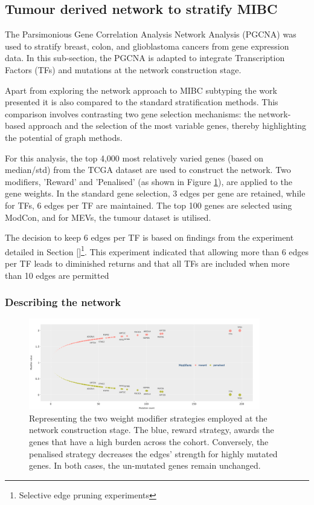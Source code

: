 \subsection{Tumour derived network to stratify MIBC} \label{s:N_I:tum}


The Parsimonious Gene Correlation Analysis Network Analysis (PGCNA) was used to stratify breast, colon, and glioblastoma cancers \cite{Care2019-ij,Tanner2023-wa} from gene expression data. In this sub-section, the PGCNA is adapted to integrate Transcription Factors (TFs) and mutations at the network construction stage. 

Apart from exploring the network approach to MIBC subtyping the work presented it is also compared to the standard stratification methods. This comparison involves contrasting two gene selection mechanisms: the network-based approach and the selection of the most variable genes, thereby highlighting the potential of graph methods.

For this analysis, the top 4,000 most relatively varied genes (based on median/std) from the TCGA dataset are used to construct the network. Two modifiers, 'Reward' and 'Penalised' (as shown in Figure \ref{fig:N_I:modifiers}), are applied to the gene weights. In the standard gene selection, 3 edges per gene are retained, while for TFs, 6 edges per TF are maintained. The top 100 genes are selected using ModCon, and for MEVs, the tumour dataset is utilised.

The decision to keep 6 edges per TF is based on findings from the experiment detailed in Section \ref{}\footnote{Selective edge pruning experiments}. This experiment indicated that allowing more than 6 edges per TF leads to diminished returns and that all TFs are included when more than 10 edges are permitted

\subsubsection{Describing the network} \label{s:N_I:tum_describe}

\begin{figure}[!htb]    \centering\includegraphics[width=0.9\textwidth,height=0.9\textheight,keepaspectratio]{Sections/Network_I/Resources/Methods/modifiers.png}
    \caption{Representing the two weight modifier strategies employed at the network construction stage. The blue, reward strategy, awards the genes that have a high burden across the cohort. Conversely, the  penalised strategy decreases the edges' strength for highly mutated genes. In both cases, the un-mutated genes remain unchanged.}
    \label{fig:N_I:modifiers}
\end{figure}

